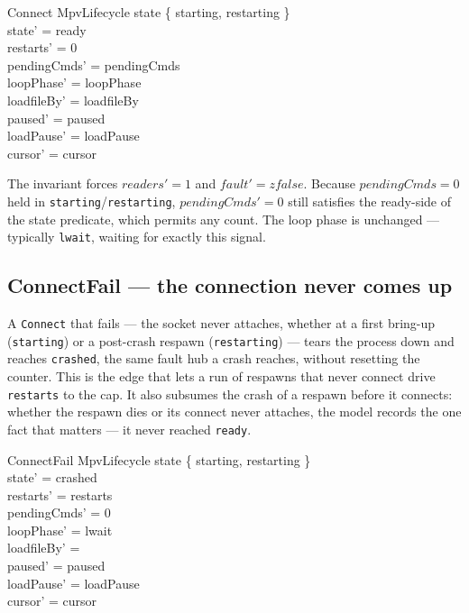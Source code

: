 \documentclass[a4paper,10pt,fleqn]{article}
\begin{document}
\begin{schema}{Connect}
  \Delta MpvLifecycle
  \where
  state \in \{ starting, restarting \} \\
  state' = ready \\
  restarts' = 0 \\
  pendingCmds' = pendingCmds \\
  loopPhase' = loopPhase \\
  loadfileBy' = loadfileBy \\
  paused' = paused \\
  loadPause' = loadPause \\
  cursor' = cursor
\end{schema}

The invariant forces $readers' = 1$ and $fault' = zfalse$. Because
$pendingCmds = 0$ held in \texttt{starting}/\texttt{restarting}, $pendingCmds'
= 0$ still satisfies the ready-side of the state predicate, which permits any
count. The loop phase is unchanged --- typically \texttt{lwait}, waiting for
exactly this signal.

\subsection{ConnectFail --- the connection never comes up}
\label{sec:connectfail}

A \texttt{Connect} that fails --- the socket never attaches, whether at a first
bring-up (\texttt{starting}) or a post-crash respawn (\texttt{restarting}) ---
tears the process down and reaches \texttt{crashed}, the same fault hub a crash
reaches, without resetting the counter. This is the edge that lets a run of
respawns that never connect drive \texttt{restarts} to the cap. It also subsumes
the crash of a respawn before it connects: whether the respawn dies or its
connect never attaches, the model records the one fact that matters --- it never
reached \texttt{ready}.

\begin{schema}{ConnectFail}
  \Delta MpvLifecycle
  \where
  state \in \{ starting, restarting \} \\
  state' = crashed \\
  restarts' = restarts \\
  pendingCmds' = 0 \\
  loopPhase' = lwait \\
  loadfileBy' = \emptyset \\
  paused' = paused \\
  loadPause' = loadPause \\
  cursor' = cursor
\end{schema}
\end{document}
